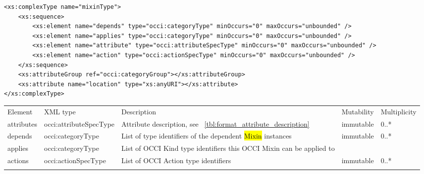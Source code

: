 \documentclass[10pt,a4paper]{article}
\begin{document}
\begin{lstlisting}
<xs:complexType name="mixinType">
	<xs:sequence>
		<xs:element name="depends" type="occi:categoryType" minOccurs="0" maxOccurs="unbounded" />
		<xs:element name="applies" type="occi:categoryType" minOccurs="0" maxOccurs="unbounded" />
		<xs:element name="attribute" type="occi:attributeSpecType" minOccurs="0" maxOccurs="unbounded" />
		<xs:element name="action" type="occi:actionSpecType" minOccurs="0" maxOccurs="unbounded" />
	</xs:sequence>
	<xs:attributeGroup ref="occi:categoryGroup"></xs:attributeGroup>
	<xs:attribute name="location" type="xs:anyURI"></xs:attribute>
</xs:complexType>
\end{lstlisting}

 {
    \begin{tabularx}{\textwidth}{llXll}
    \toprule
    Element & XML type & Description & Mutability & Multiplicity \\
    \colrule
    attributes & occi:attributeSpecType & Attribute description, see
~\ref{tbl:format_attribute_description} & immutable & 0..* \\

    depends & occi:categoryType & List of type identifiers of the dependent
 \hl{Mixin} instances & immutable & 0..* \\
 
    applies & occi:categoryType & List of OCCI Kind type identifiers this OCCI 
Mixin can be applied to \\

    actions & occi:actionSpecType & List of OCCI Action type identifiers
& immutable & 0..* \\
    \botrule
    \end{tabularx}
}
\FloatBarrier
\end{document}
